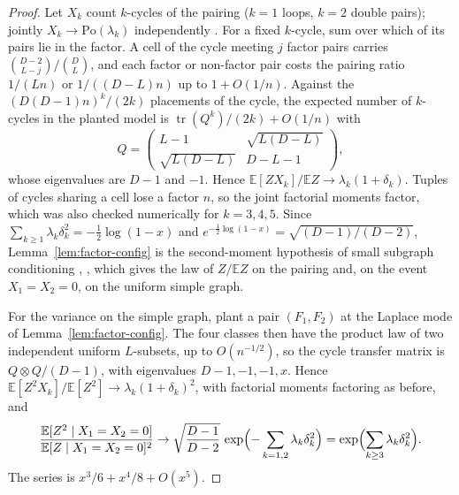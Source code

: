 \documentclass[11pt]{article}
\newcommand{\EE}{\mathbb{E}}
\begin{document}
\begin{proof}
Let \(X_k\) count \(k\)-cycles of the pairing (\(k=1\) loops, \(k=2\) double
pairs); jointly \(X_k\to\mathrm{Po}(\lambda_k)\) independently
\cite[§2]{Wormald99}. For a fixed \(k\)-cycle, sum over which of its pairs lie
in the factor. A cell of the cycle meeting \(j\) factor pairs carries
\(\binom{D-2}{L-j}/\binom{D}{L}\), and each factor or non-factor pair costs the
pairing ratio \(1/(Ln)\) or \(1/((D-L)n)\) up to \(1+O(1/n)\). Against the
\((D(D-1)n)^k/(2k)\) placements of the cycle, the expected number of
\(k\)-cycles in the planted model is \(\operatorname{tr}(Q^k)/(2k)+O(1/n)\) with
\[
Q=\begin{pmatrix}L-1&\sqrt{L(D-L)}\\ \sqrt{L(D-L)}&D-L-1\end{pmatrix},
\]
whose eigenvalues are \(D-1\) and \(-1\). Hence
\(\EE[Z X_k]/\EE Z\to\lambda_k(1+\delta_k)\). Tuples of cycles sharing a cell
lose a factor \(n\), so the joint factorial moments factor, which was also
checked numerically for \(k=3,4,5\). Since
\(\sum_{k\ge1}\lambda_k\delta_k^2=-\tfrac12\log(1-x)\) and
\(e^{-\frac12\log(1-x)}=\sqrt{(D-1)/(D-2)}\), Lemma~\ref{lem:factor-config} is
the second-moment hypothesis of small subgraph conditioning
\cite{Janson95}, \cite[Theorem~4.1]{Wormald99}, which gives the law of
\(Z/\EE Z\) on the pairing and, on the event \(X_1=X_2=0\), on the uniform
simple graph.

For the variance on the simple graph, plant a pair \((F_1,F_2)\) at the
Laplace mode of Lemma~\ref{lem:factor-config}. The four classes then have the
product law of two independent uniform \(L\)-subsets, up to \(O(n^{-1/2})\), so
the cycle transfer matrix is \(Q\otimes Q/(D-1)\), with eigenvalues
\(D-1,-1,-1,x\). Hence \(\EE[Z^2X_k]/\EE[Z^2]\to\lambda_k(1+\delta_k)^2\), with
factorial moments factoring as before, and
\[
\frac{\EE[Z^2\mid X_1=X_2=0]}{\EE[Z\mid X_1=X_2=0]^2}
\to
\sqrt{\frac{D-1}{D-2}}\,
\exp\Bigl(-\sum_{k=1,2}\lambda_k\delta_k^2\Bigr)
=
\exp\Bigl(\sum_{k\ge3}\lambda_k\delta_k^2\Bigr).
\]
The series is \(x^3/6+x^4/8+O(x^5)\).
\end{proof}
\end{document}
